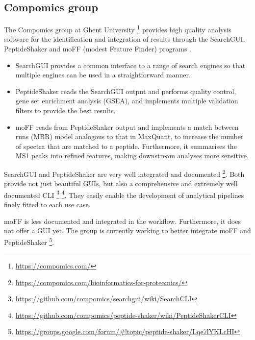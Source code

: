 \documentclass[11pt, a4paper]{report}
\begin{document}
\subsection{Compomics group}

The Compomics group at Ghent University \footnote{\href{https://compomics.com/}{https://compomics.com/}} provides high quality  analysis software for the identification and integration of results through the SearchGUI, PeptideShaker and moFF (modest Feature Finder) programs \cite{Barsnes2018} \cite{Vaudel2015} \cite{Argentini2016}.

\begin{itemize}

\item SearchGUI provides a common interface to a range of search engines so that multiple engines can be used in a straightforward manner.

\item PeptideShaker reads the SearchGUI output and performs quality control, gene set enrichment analysis (GSEA), and implements multiple validation filters to provide the best results.

\item moFF reads from PeptideShaker output and implements a match between runs (MBR) model analogous to that in MaxQuant, to increase the number of spectra that are matched to a peptide. Furthermore, it summarises the \ac{MS1} peaks into refined features, making downstream analyses more sensitive.

\end{itemize}

SearchGUI and PeptideShaker are very well integrated and documented \footnote{\href{https://compomics.com/bioinformatics-for-proteomics/}{https://compomics.com/bioinformatics-for-proteomics/}}. Both provide not just beautiful GUIs, but also a comprehensive and extremely well documented CLI \footnote{\href{https://github.com/compomics/searchgui/wiki/SearchCLI}{https://github.com/compomics/searchgui/wiki/SearchCLI}} \footnote{\href{https://github.com/compomics/peptide-shaker/wiki/PeptideShakerCLI}{https://github.com/compomics/peptide-shaker/wiki/PeptideShakerCLI}}. They easily enable the development of analytical pipelines finely fitted to each use case.

moFF is less documented and integrated in the workflow. Furthermore, it does not offer a GUI yet. The group is currently working to better integrate moFF and PeptideShaker \footnote{\href{https://groups.google.com/forum/\#!topic/peptide-shaker/Lqe7lYKLcHI}{https://groups.google.com/forum/\#!topic/peptide-shaker/Lqe7lYKLcHI}}.
\end{document}
